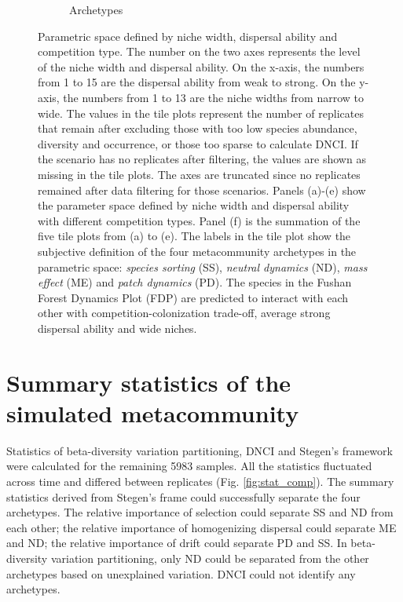 \begin{figure}
\begin{subfigure}[b]{0.45\linewidth}
			\caption{Archetypes}
			\label{fig:para-arch}
		\end{subfigure}
		\caption[Parametric space defined by niche width, dispersal ability and competition type.]{\small
			Parametric space defined by niche width, dispersal ability and competition type. The number on the two axes represents the level of the niche width and dispersal ability. On the x-axis, the numbers from 1 to 15 are the dispersal ability from weak to strong. On the y-axis, the numbers from 1 to 13 are the niche widths from narrow to wide. The values in the tile plots represent the number of replicates that remain after excluding those with too low species abundance, diversity and occurrence, or those too sparse to calculate DNCI. If the scenario has no replicates after filtering, the values are shown as missing in the tile plots. The axes are truncated since no replicates remained after data filtering for those scenarios. Panels (a)-(e) show the parameter space defined by niche width and dispersal ability with different competition types. Panel (f) is the summation of the five tile plots from (a) to (e). The labels in the tile plot show the subjective definition of the four metacommunity archetypes in the parametric space: \textit{species sorting} (SS), \textit{neutral dynamics} (ND), \textit{mass effect} (ME) and \textit{patch dynamics} (PD). The species in the Fushan Forest Dynamics Plot (FDP) are predicted to interact with each other with competition-colonization trade-off, average strong dispersal ability and wide niches.}
		\label{fig:para}
	\end{figure}
	
	\section{Summary statistics of the simulated metacommunity}
	\noindent
	Statistics of beta-diversity variation partitioning, DNCI and Stegen's framework were calculated for the remaining 5983 samples. All the statistics fluctuated across time and differed between replicates (Fig. \ref{fig:stat_comp}). The summary statistics derived from Stegen's frame could successfully separate the four archetypes. The relative importance of selection could separate SS and ND from each other; the relative importance of homogenizing dispersal could separate ME and ND; the relative importance of drift could separate PD and SS. In beta-diversity variation partitioning, only ND could be separated from the other archetypes based on unexplained variation. DNCI could not identify any archetypes.
	
